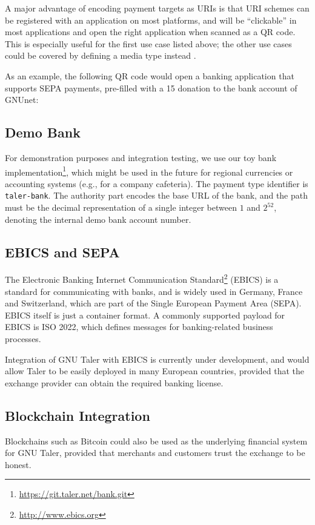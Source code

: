 A major advantage of encoding payment targets as URIs is that URI schemes can be registered
with an application on most platforms, and will be ``clickable'' in most applications and open the right
application when scanned as a QR code.  This is especially useful for the first use case listed above; the other use cases
could be covered by defining a media type instead \cite{rfc6838}.

As an example, the following QR code would open a banking application that supports SEPA payments,
pre-filled with a 15\EUR{} donation to the bank account of GNUnet:

\begin{center}
\end{center}

\subsection{Demo Bank}
For demonstration purposes and integration testing, we use our toy bank
implementation\footnote{\url{https://git.taler.net/bank.git}}, which might be
used in the future for regional currencies or accounting systems (e.g., for a
company cafeteria).  The payment type identifier is \texttt{taler-bank}.  The
authority part encodes the base URL of the bank, and the path must be the
decimal representation of a single integer between $1$ and $2^{52}$, denoting
the internal demo bank account number.

\subsection{EBICS and SEPA}
The Electronic Banking Internet Communication Standard\footnote{\url{http://www.ebics.org}} (EBICS) is a standard
for communicating with banks, and is widely used in Germany, France and
Switzerland, which are part of the Single European Payment Area (SEPA).  EBICS
itself is just a container format.  A commonly supported payload for EBICS is
ISO 2022, which defines messages for banking-related business processes.

Integration of GNU Taler with EBICS is currently under development, and would
allow Taler to be easily deployed in many European countries, provided that the
exchange provider can obtain the required banking license.

\subsection{Blockchain Integration}
Blockchains such as Bitcoin could also be used as the underlying financial
system for GNU Taler, provided that merchants and customers trust the exchange to be honest.

